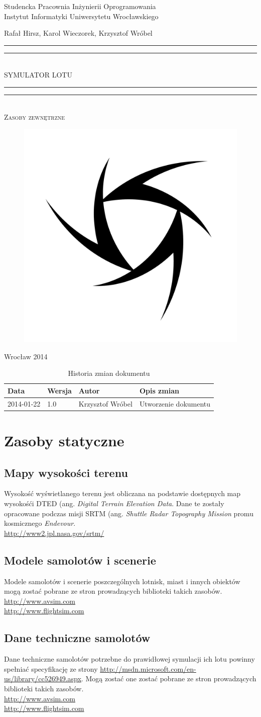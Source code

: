\documentclass{mwrep}
\newcommand*{\titleGP}{\begingroup
\centering

{\large Studencka Pracownia Inżynierii Oprogramowania}\\Instytut Informatyki Uniwersytetu Wrocławskiego\par
\vspace*{16\baselineskip}

{\Large Rafał Hirsz, Karol Wieczorek, Krzysztof Wróbel\par}
\vspace*{\baselineskip}

\rule{\textwidth}{1.6pt}\vspace*{-\baselineskip}\vspace*{2pt}
\rule{\textwidth}{0.4pt}\\[\baselineskip]

{\Huge SYMULATOR LOTU}\\[0.2\baselineskip]

\rule{\textwidth}{0.4pt}\vspace*{-\baselineskip}\vspace{3.2pt}
\rule{\textwidth}{1.6pt}\\[\baselineskip]

\scshape
{\huge Zasoby zewnętrzne}\par
\vspace*{2\baselineskip}

\begin{figure}[h]
\centering
\includegraphics[width=5\baselineskip]{flightsim-team-logo.pdf}
\end{figure}
\vfill

{\large Wrocław 2014}\par

\pagebreak

\endgroup}
\begin{document}
\thispagestyle{empty}
\titleGP

\begin{center}
\begin{table}[h]
\begin{center}
\caption{Historia zmian dokumentu}\label{T:Zmiany}
\vspace{3ex}
\begin{tabularx}{1\textwidth}{|l|l|l|X|}
\hline
Data & Wersja & Autor & Opis zmian \\ \hline
2014-01-22 & 1.0 & Krzysztof Wróbel & Utworzenie dokumentu \\
\hline
\end{tabularx}
\end{center}
\end{table}
\end{center}

\pagebreak

\tableofcontents

\chapter{Zasoby statyczne}

\section{Mapy wysokości terenu}
Wysokość wyświetlanego terenu jest obliczana na podstawie dostępnych map wysokośći DTED (ang. \emph{Digital Terrain Elevation Data}. Dane te zostały opracowane podczas misji SRTM (ang. \emph{Shuttle Radar Topography Mission} promu kosmicznego \emph{Endevour}.\\
\url{http://www2.jpl.nasa.gov/srtm/}

\section{Modele samolotów i scenerie}
Modele samolotów i scenerie poszczególnych lotnisk, miast i innych \linebreak  obiektów mogą zostać pobrane ze stron prowadzących biblioteki takich zasobów.\\
\url{http://www.avsim.com}\\
\url{http://www.flightsim.com}

\section{Dane techniczne samolotów}
Dane techniczne samolotów potrzebne do prawidłowej symulacji ich lotu powinny spełniać specyfikację ze strony \url{http://msdn.microsoft.com/en-us/library/cc526949.aspx}. Mogą zostać one zostać pobrane ze stron prowadzących biblioteki takich zasobów.\\
\url{http://www.avsim.com}\\
\url{http://www.flightsim.com}
\end{document}
